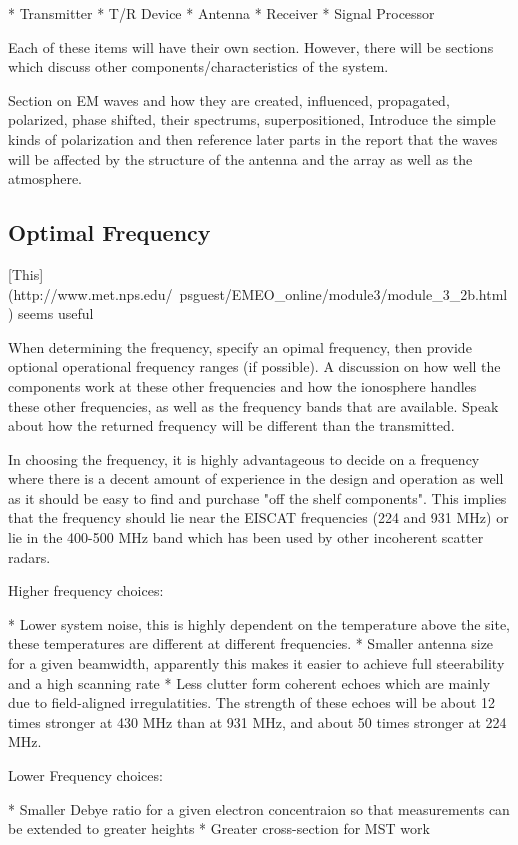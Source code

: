 \documentclass[11pt]{witseiepaper}
\begin{document}
    * Transmitter
    * T/R Device
    * Antenna
    * Receiver
    * Signal Processor

Each of these items will have their own section.
However, there will be sections which discuss other components/characteristics of the system.

Section on EM waves and how they are created, influenced, propagated, polarized, phase shifted, their spectrums, superpositioned, 
Introduce the simple kinds of polarization and then reference later parts in the report that the waves will be affected by the structure of the antenna and the array as well as the atmosphere.

\subsection{Optimal Frequency}
[This](http://www.met.nps.edu/~psguest/EMEO\_online/module3/module\_3\_2b.html) seems useful

When determining the frequency, specify an opimal frequency, then provide optional operational frequency ranges (if possible). A discussion on how well the components work at these other frequencies and how the ionosphere handles these other frequencies, as well as the frequency bands that are available.
Speak about how the returned frequency will be different than the transmitted.

In choosing the frequency, it is highly advantageous to decide on a frequency where there is a decent amount of experience in the design and operation as well as it should be easy to find and purchase "off the shelf components". This implies that the frequency should lie near the EISCAT frequencies (224 and 931 MHz) or lie in the 400-500 MHz band which has been used by other incoherent scatter radars.

Higher frequency choices:

    * Lower system noise, this is highly dependent on the temperature above the site, these temperatures are different at different frequencies.
    * Smaller antenna size for a given beamwidth, apparently this makes it easier to achieve full steerability and a high scanning rate
    * Less clutter form coherent echoes which are mainly due to field-aligned irregulatities. The strength of these echoes will be about 12 times stronger at 430 MHz than at 931 MHz, and about 50 times stronger at 224 MHz.

Lower Frequency choices:

    * Smaller Debye ratio for a given electron concentraion so that measurements can be extended to greater heights
    * Greater cross-section for MST work
\end{document}
